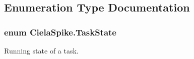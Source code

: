 \subsection{Enumeration Type Documentation}
\subsubsection[{\texorpdfstring{Task\+State}{TaskState}}]{\setlength{\rightskip}{0pt plus 5cm}enum {\bf Ciela\+Spike.\+Task\+State}\hspace{0.3cm}{\ttfamily [strong]}}\hypertarget{namespace_ciela_spike_a4782eb2c0b65a1d593a94740bf994960}{}\label{namespace_ciela_spike_a4782eb2c0b65a1d593a94740bf994960}


Running state of a task. 

